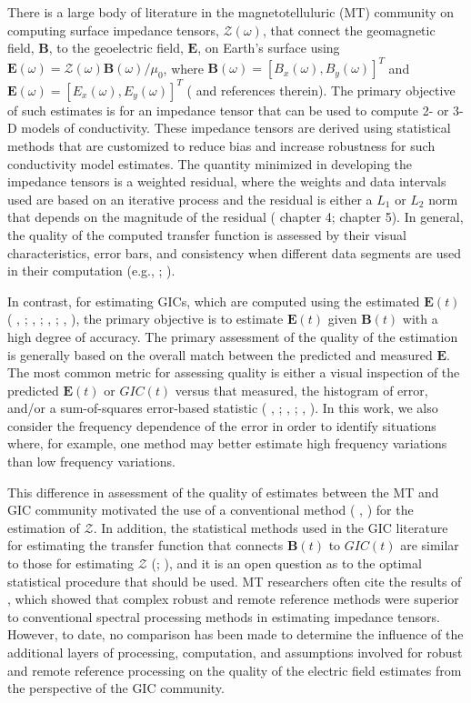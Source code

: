\documentclass[12pt]{article}
\newcommand{\citeay}[1]{%
\citeauthor{#1}, \citeyear{#1}%
}
\begin{document}
There is a large body of literature in the magnetotelluluric (MT) community on computing surface impedance tensors, $\mathcal{Z}(\omega)$, that connect the geomagnetic field, $\mathbf{B}$, to the geoelectric field, $\mathbf{E}$, on Earth's surface using $\mathbf{E}(\omega) = \mathcal{Z}(\omega)\mathbf{B}(\omega)/\mu_0$, where $\mathbf{B}(\omega) = [B_x(\omega),B_y(\omega)]^T$ and $\mathbf{E}(\omega) = [E_x(\omega),E_y(\omega)]^T$ (\cite{Chave2012} and references therein).  The primary objective of such estimates is for an impedance tensor that can be used to compute 2- or 3-D models of conductivity. These impedance tensors are derived using statistical methods that are customized to reduce bias and increase robustness for such conductivity model estimates.  The quantity minimized in developing the impedance tensors is a weighted residual, where the weights and data intervals used are based on an iterative process and the residual is either a $L_1$ or $L_2$ norm that depends on the magnitude of the residual (\cite{Simpson2005} chapter 4; \cite{Chave2012} chapter 5).  In general, the quality of the computed transfer function is assessed by their visual characteristics, error bars, and consistency when different data segments are used in their computation (e.g., \cite{Jones1989}; \cite{Fujii2015}).

In contrast, for estimating GICs, which are computed using the estimated $\mathbf{E}(t)$ (\citeay{Lehtinen1985}; \citeay{Pulkkinen2010}; \citeay{Viljanen2012}; \citeay{NERC2015}), the primary objective is to estimate $\mathbf{E}(t)$ given $\mathbf{B}(t)$ with a high degree of accuracy.  The primary assessment of the quality of the estimation is generally based on the overall match between the predicted and measured $\mathbf{E}$.  The most common metric for assessing quality is either a visual inspection of the predicted $\mathbf{E}(t)$ or $GIC(t)$ versus that measured, the histogram of error, and/or a sum-of-squares error-based statistic  (\citeay{McKay2003}; \citeay{Pulkkinen2010}; \citeay{Love2014}).  In this work, we also consider the frequency dependence of the error in order to identify situations where, for example, one method may better estimate high frequency variations than low frequency variations.

This difference in assessment of the quality of estimates between the MT and GIC community motivated the use of a conventional method (\citeay{Sims1971}) for the estimation of $\mathcal{Z}$.  In addition, the statistical methods used in the GIC literature for estimating the transfer function that connects $\mathbf{B}(t)$ to $GIC(t)$ are similar to those for estimating $\mathcal{Z}$ (\cite{McKay2003}; \cite{Pulkkinen2007}), and it is an open question as to the optimal statistical procedure that should be used.  MT researchers often cite the results of \cite{Jones1989}, which showed that complex robust and remote reference methods were superior to conventional spectral processing methods in estimating impedance tensors.  However, to date, no comparison has been made to determine the influence of the additional layers of processing, computation, and assumptions involved for robust and remote reference processing on the quality of the electric field estimates from the perspective of the GIC community. 
\end{document}
